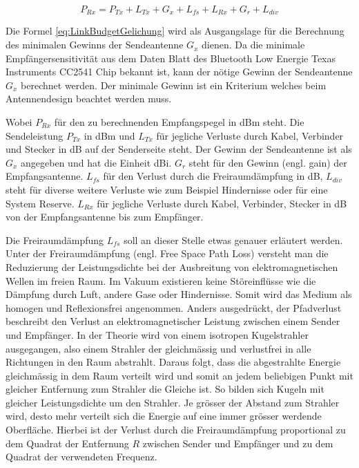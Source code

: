 \begin{equation}
P_{Rx} = P_{Tx}+L_{Tx}+G_{x}+L_{fs}+L_{Rx}+G_{r}+L_{div}\label{eq:LinkBudgetGelichung}
\end{equation}

Die Formel \ref{eq:LinkBudgetGelichung} wird als Ausgangslage für die Berechnung des minimalen Gewinns der Sendeantenne $G_{x}$ dienen. Da  die minimale Empfängersensitivität aus dem Daten Blatt des  Bluetooth Low Energie Texas Instruments CC2541 Chip bekannt ist, kann der nötige Gewinn der Sendeantenne $G_{x}$ berechnet werden. Der minimale Gewinn ist ein Kriterium welches beim Antennendesign beachtet werden muss.

Wobei $P_{Rx}$ für den zu berechnenden Empfangspegel in dBm steht.  Die Sendeleistung $P_{Tx}$ in dBm und $L_{Tx}$ für jegliche Verluste durch Kabel, Verbinder und Stecker in dB auf der Senderseite steht. Der Gewinn der Sendeantenne ist als $G_{x}$ angegeben und hat die Einheit dBi. $G_{r}$ steht für den Gewinn (engl. gain) der Empfangsantenne. $L_{fs}$ für den Verlust durch die Freiraumdämpfung in dB, $L_{div}$ steht für diverse weitere Verluste wie zum Beispiel Hindernisse oder für eine System Reserve.  $L_{Rx}$ für jegliche Verluste durch Kabel, Verbinder, Stecker in dB von der Empfangsantenne bis zum Empfänger.


Die Freiraumdämpfung $L_{fs}$ soll an dieser Stelle etwas genauer erläutert werden. Unter der Freiraumdämpfung (engl. Free Space Path Loss)  versteht man die Reduzierung der Leistungsdichte bei der Ausbreitung von elektromagnetischen Wellen im freien Raum. Im Vakuum existieren keine Störeinflüsse wie die Dämpfung durch Luft, andere Gase oder  Hindernisse. Somit wird das Medium als homogen  und Reflexionsfrei angenommen. Anders ausgedrückt, der Pfadverlust beschreibt den Verlust an elektromagnetischer Leistung zwischen einem Sender und Empfänger.
In der Theorie wird von einem isotropen Kugelstrahler ausgegangen, also einem Strahler der gleichmässig und verlustfrei in alle Richtungen in den Raum abstrahlt. Daraus folgt, dass die abgestrahlte Energie gleichmässig in dem Raum verteilt wird und somit an jedem beliebigen Punkt mit gleicher Entfernung zum Strahler die Gleiche ist. So bilden sich Kugeln mit gleicher Leistungsdichte um den Strahler. Je grösser der Abstand zum Strahler wird, desto mehr verteilt sich die Energie auf eine immer grösser werdende Oberfläche. Hierbei ist der Verlust durch die Freiraumdämpfung proportional zu dem Quadrat der Entfernung $R$ zwischen Sender und Empfänger und zu dem Quadrat der verwendeten Frequenz.
\cite{linkbudget}

